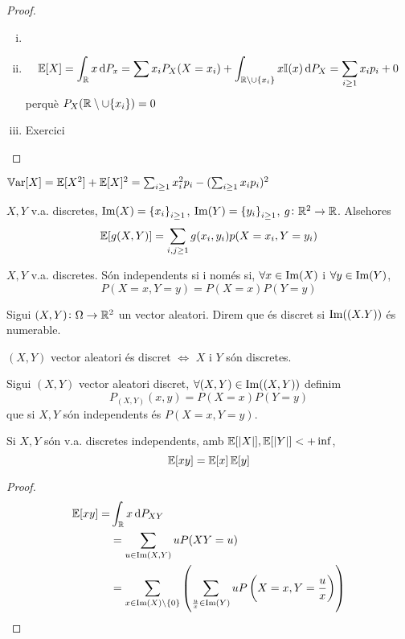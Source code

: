 \begin{proof}
    \begin{enumerate}[i)]
        \item[]
        \item \[        \esp[X] = \int_{\real}{x\dif P_x} = \sum{x_i P_X(X=x_i) + \int_{\real\setminus\cup\{x_i\}}{x\mathbb{I}(x) \dif P_X}} = \sum_{i \ge 1}{x_i p_i} + 0\]
            perquè $P_X(\mathbb{R}\setminus\cup\{x_i\}) = 0$
        \item Exercici
    \end{enumerate}
\end{proof}

\begin{obs}
    $\operatorname{\mathbb{V}ar}[X] = \operatorname{\mathbb{E}}[X^2] + \operatorname{\mathbb{E}}[X]^2 = \sum_{i \ge 1}{x_i^2 p_i} - (\sum_{i \ge 1}{x_i p_i})^2$
\end{obs}

\begin{prop}
    $X, Y$ v.a. discretes, $\operatorname{Im}(X) = \left\{ x_i \right\}_{i \ge 1}$, $\operatorname{Im}(Y) = \left\{ y_i \right\}_{i \ge 1}$, $g\colon \mathbb{R}^2\to\mathbb{R}$. Alsehores
    \[\operatorname{\mathbb{E}}[g(X,Y)] = \sum_{i,j \ge 1}{g(x_i,y_i) p(X=x_i, Y=y_i)}\]
\end{prop}

\begin{prop}
    $X,Y$ v.a. discretes. Són independents si i només si, $\forall x \in\operatorname{Im}(X)$ i $\forall y \in\operatorname{Im}(Y)$,
    \[P(X=x, Y=y) = P(X=x)P(Y=y)\]
\end{prop}

\begin{defi}
    Sigui $(X,Y)\colon \Omega\to\mathbb{R}^2$ un vector aleatori. Direm que és discret si $\operatorname{Im}((X.Y))$ és numerable.
\end{defi}

\begin{obs}
    $(X,Y)$ vector aleatori és discret $\iff$ $X$ i $Y$ són discretes.
\end{obs}

\begin{defi}
    Sigui $(X,Y)$ vector aleatori discret, $\forall(X,Y) \in \operatorname{Im}((X,Y))$ definim
    \[P_{(X,Y)}(x,y) = P(X=x)P(Y=y)\]
    que si $X,Y$ són independents és $P(X=x,Y=y)$.
\end{defi}

\begin{lema}
    Si $X,Y$ són v.a. discretes independents, amb $\operatorname{\mathbb{E}}[|X|], \operatorname{\mathbb{E}}[|Y|] < +\inf$,
    \[\operatorname{\mathbb{E}}[xy] = \operatorname{\mathbb{E}}[x]\operatorname{\mathbb{E}}[y]\]
\end{lema}

\begin{proof}
    \[\begin{aligned}
    \esp[xy] =& \int_\real x\dif P_{XY} \\
    &= \sum_{u\in\im(X,Y)}{uP(XY=u)} \\
    &= \sum_{x\in\im(X)\setminus\{0\}} \lp\sum_{\frac{u}{x}\in\im(Y)} uP\lp X=x,Y=\frac{u}{x} \rp\rp
    \end{aligned}\]

\end{proof}





